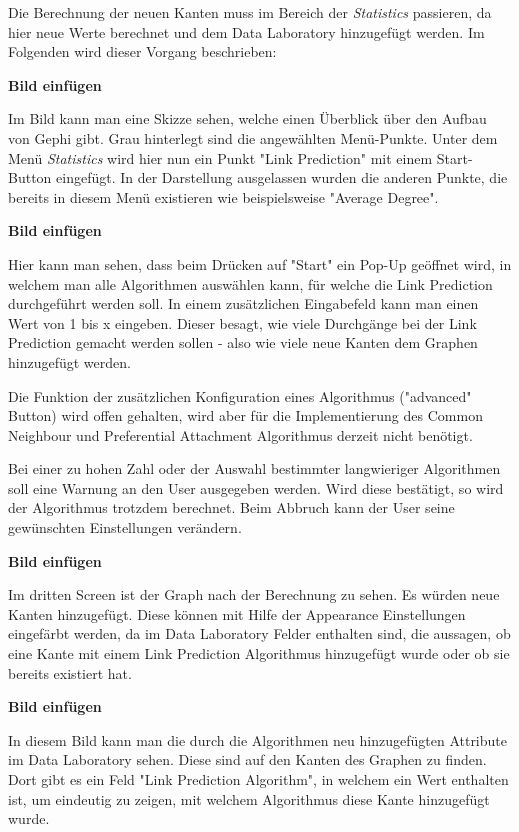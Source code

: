 Die Berechnung der neuen Kanten muss im Bereich der \textit{Statistics} passieren, da hier neue Werte berechnet und dem
Data Laboratory hinzugefügt werden. Im Folgenden wird dieser Vorgang beschrieben:

\textbf{Bild einfügen}

Im Bild kann man eine Skizze sehen, welche einen Überblick über den Aufbau von Gephi gibt. Grau hinterlegt sind die
angewählten Menü-Punkte. Unter dem Menü \textit{Statistics} wird hier nun ein Punkt "Link Prediction" mit einem
Start-Button eingefügt. In der Darstellung ausgelassen wurden die anderen Punkte, die bereits in diesem Menü existieren
wie beispielsweise "Average Degree".

\textbf{Bild einfügen}

Hier kann man sehen, dass beim Drücken auf "Start" ein Pop-Up geöffnet wird, in welchem man alle Algorithmen auswählen
kann, für welche die Link Prediction durchgeführt werden soll. In einem zusätzlichen Eingabefeld kann man einen Wert
von 1 bis x eingeben. Dieser besagt, wie viele Durchgänge bei der Link Prediction gemacht werden sollen - also wie viele
neue Kanten dem Graphen hinzugefügt werden.

Die Funktion der zusätzlichen Konfiguration eines Algorithmus ("advanced" Button) wird offen gehalten, wird aber für die
Implementierung des Common Neighbour und Preferential Attachment Algorithmus derzeit nicht benötigt.

Bei einer zu hohen Zahl oder der Auswahl bestimmter langwieriger Algorithmen soll eine Warnung an den User ausgegeben
werden. Wird diese bestätigt, so wird der Algorithmus trotzdem berechnet. Beim Abbruch kann der User seine gewünschten
Einstellungen verändern.

\textbf{Bild einfügen}

Im dritten Screen ist der Graph nach der Berechnung zu sehen. Es würden neue Kanten hinzugefügt. Diese können mit Hilfe
der Appearance Einstellungen eingefärbt werden, da im Data Laboratory Felder enthalten sind, die aussagen, ob eine
Kante mit einem Link Prediction Algorithmus hinzugefügt wurde oder ob sie bereits existiert hat.

\textbf{Bild einfügen}

In diesem Bild kann man die durch die Algorithmen neu hinzugefügten Attribute im Data Laboratory sehen. Diese sind auf
den Kanten des Graphen zu finden. Dort gibt es ein Feld "Link Prediction Algorithm", in welchem ein Wert enthalten ist,
um eindeutig zu zeigen, mit welchem Algorithmus diese Kante hinzugefügt wurde.


